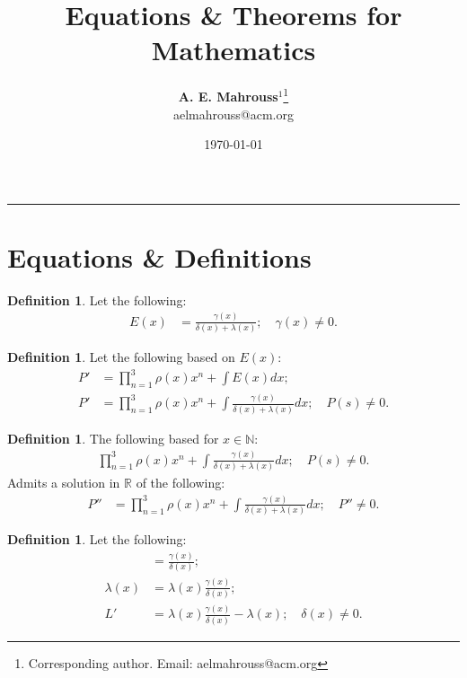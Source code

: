 \documentclass[10pt]{article}
\title{%
  \vspace{-1.5em}%
  \large\textbf{Equations \& Theorems for Mathematics}%
}
\author{%
  \textbf{A. E. Mahrouss}$^{1}$\thanks{Corresponding author. Email: aelmahrouss@acm.org}
  \\aelmahrouss@acm.org\\[0.4em]
}
\date{%
  \small \today
}
\theoremstyle{plain}
\theoremstyle{definition}
\newtheorem{definition}[theorem]{Definition}
\theoremstyle{remark}
\begin{document}

  \maketitle
  \vspace{-0.5em}
  \vspace{0.8em}
  \rule{\linewidth}{0.4pt}
  \vspace{1em}


\section{Equations \& Definitions}

\begin{definition}
	Let the following:
	\begin{align*}
		E(x) &= \frac{\gamma(x)}{\delta(x) + \lambda(x)}; \quad \gamma(x) \neq 0.
	\end{align*}
\end{definition}

\begin{definition}
	Let the following based on $E(x)$:
	\begin{align*}
		P' &= \prod_{n=1}^{3}\rho(x) x^{n} + \int E(x) dx;\\
		P' &= \prod_{n=1}^{3}\rho(x) x^{n} + \int \frac{\gamma(x)}{\delta(x) + \lambda(x)} dx; \quad P(s) \neq 0.
	\end{align*}
\end{definition}

\begin{definition}
	The following based for $x \in \mathbb{N}$:
	\begin{align*}
		\prod_{n=1}^{3}\rho(x) x^{n} + \int \frac{\gamma(x)}{\delta(x) + \lambda(x)} dx; \quad P(s) \neq 0.
	\end{align*}
	Admits a solution in $\mathbb{R}$ of the following:
	\begin{align*}
		P'' &= \prod_{n=1}^{3}\rho(x) x^{n} + \int \frac{\gamma(x)}{\delta(x) + \lambda(x)} dx; \quad P'' \neq 0.
	\end{align*}
\end{definition}

\begin{definition}
	Let the following:
	\begin{align*}
		&= \frac{\gamma(x)}{\delta(x)};\\
	 	\lambda(x) &=  \lambda(x) \frac{\gamma(x)}{\delta(x)};\\
	 	L' &= \lambda(x) \frac{\gamma(x)}{\delta(x)} - \lambda(x); \quad \delta(x) \neq 0.
	\end{align*}
\end{definition}
\end{document}
